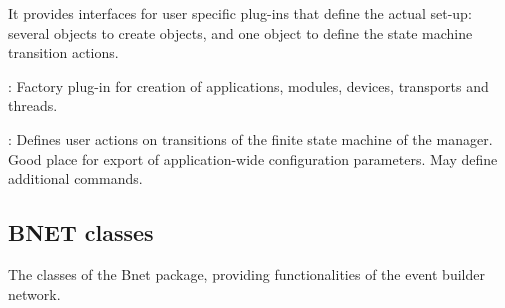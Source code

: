 \begin{description}
\begin{compactenum}
      \item It provides interfaces for user specific plug-ins that define 
      the actual set-up: \\
      several  objects to create objects, and 
      one  object to define the state machine transition actions.
\end{compactenum}

\item[\class{dabc::Factory}] : 
	Factory plug-in for creation of applications, modules, devices, transports and threads.

\item[\class{dabc::Application}] : 
Defines user actions on transitions of the finite state machine of the manager.
Good place for export of application-wide configuration parameters. 
May define additional commands.
\end{description}



\subsection{BNET classes}
\label{prog_bnet_classes}
The classes of the Bnet package, providing functionalities of the event builder network.

